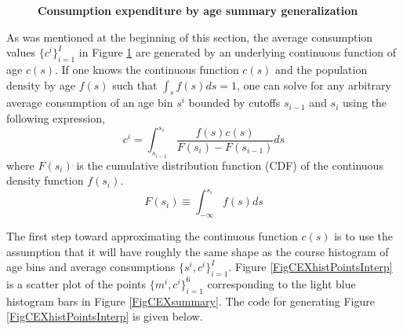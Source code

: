 \documentclass[letterpaper,12pt]{article}
\theoremstyle{definition}
\begin{document}
      \begin{figure}[htb]\centering\captionsetup{width=4.0in}
        \caption{\textbf{Consumption expenditure by age summary generalization}}\label{FigCEXsummaryGen}
      \end{figure}

      As was mentioned at the beginning of this section, the average consumption values $\{c^i\}_{i=1}^I$ in Figure \ref{FigCEXsummaryGen} are generated by an underlying continuous function of age $c(s)$. If one knows the continuous function $c(s)$ and the population density by age $f(s)$ such that $\int_s f(s)ds = 1$, one can solve for any arbitrary average consumption of an age bin $s^i$ bounded by cutoffs $s_{i-1}$ and $s_i$ using the following expression,
      \begin{equation}\label{EqCi_integral}
        c^i = \int_{s_{i-1}}^{s_i}\frac{f(s)c(s)}{F(s_i) - F(s_{i-1})}ds
      \end{equation}
      where $F(s_i)$ is the cumulative distribution function (CDF) of the continuous density function $f(s_i)$.
      \begin{equation}\label{EqCDFdef}
        F(s_i)\equiv\int_{-\infty}^{s_i}f(s)ds
      \end{equation}

      The first step toward approximating the continuous function $c(s)$ is to use the assumption that it will have roughly the same shape as the course histogram of age bins and average consumptions $\{s^i,c^i\}_{i=1}^I$. Figure \ref{FigCEXhistPointsInterp} is a scatter plot of the points $\{m^i,c^i\}_{i=1}^6$ corresponding to the light blue histogram bars in Figure \ref{FigCEXsummary}. The code for generating Figure \ref{FigCEXhistPointsInterp} is given below.
\end{document}
